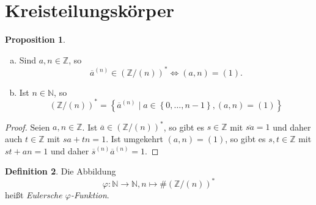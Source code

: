 \documentclass[
twoside=semi,
fontsize=12,
DIV=12, 
cleardoublepage=current,
leqno,
headings=optiontoheadandtoc, 
toc=idx
]{scrbook}
\newcommand{\N}{\mathbb{N}}
\newcommand{\Z}{\mathbb{Z}}
\newcommand{\set}[1]{\left\{ #1 \right\}}
\theoremstyle{definition}
\newtheorem{definition}{Definition}[section]
\newtheorem{proposition}[definition]{Proposition}
\begin{document}
 	\section{Kreisteilungsk\"orper}
 	
 	\begin{proposition}\label{4.1.1}\hfill
 		\begin{enumerate}[(a)]
 			\item Sind $a, n \in \Z$, so
 				\[\overline{a}^{(n)} \in (\Z/(n))^* \Longleftrightarrow (a,n) = (1).\]
 			\item Ist $n \in \N$, so 
 				\[(\Z/(n))^* = \set{\overline{a}^{(n)} \mid a \in \set{0, \dots, n-1}, (a,n) = (1)}\]
 		\end{enumerate}
 		
 		\begin{proof}
 				Seien $a, n \in \Z$. Ist $\overline{a} \in (\Z/(n))^*$, so gibt es $s \in \Z$ mit $\overline{sa} = 1$ und daher auch $t \in \Z$ mit $sa + tn = 1$.
 				Ist umgekehrt $(a,n) = (1)$, so gibt es $s, t \in \Z$ mit $st + an = 1$ und daher $\overline{s}^{(n)}\overline{a}^{(n)} = 1$.
 		\end{proof}
 	\end{proposition}
 
 	\begin{definition}\label{4.1.2}\hfill\newline
 		Die Abbildung 
 			\[\varphi: \N \to \N, n \mapsto \#(\Z/(n))^*\]
 		hei\ss t \emph{Eulersche $\varphi$-Funktion}.
 	\end{definition}
 	
\end{document}
